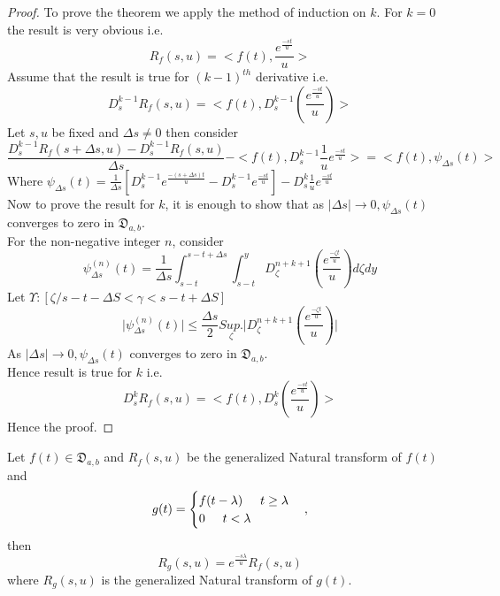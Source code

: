 \begin{proof}
To prove the theorem we apply the method of induction on $k$.
For $k=0$ the result is very obvious i.e.
\begin{equation*}
R_{f}(s,u)=<f(t),\frac{e^{\frac{-st}{u}}}{u}>
\end{equation*}
Assume that the result is true for $(k-1)^{th}$ derivative i.e.
\begin{equation*}
D_{s}^{k-1}R_{f}(s,u)=<f(t),D_{s}^{k-1}(\frac{e^{\frac{-st}{u}}}{u})>
\end{equation*}
Let $s,u$ be fixed and $\Delta{s}\neq 0$ then consider 
\begin{equation}
\frac{ D_{s}^{k-1}R_{f}(s+\Delta{s},u)-D_{s}^{k-1}R_{f}(s,u)}{\Delta{s}}-<f(t),D_{s}^{k-1}\frac{1}{u}e^{\frac{-st}{u}}>=<f(t),\psi_{\Delta{s}}(t)>
\end{equation}
Where $\psi_{\Delta{s}}(t)=\frac{1}{\Delta{s}}[D_{s}^{k-1}e^{\frac{-(s+\Delta{s})t}{u}}-D_{s}^{k-1}e^{\frac{-st}{u}}]-D_{s}^{k}\frac{1}{u}e^{\frac{-st}{u}}$\\
Now to prove the result for $k$, it is enough to show that as $\vert\Delta{s}\vert\rightarrow 0,\psi_{\Delta{s}}(t)$ converges to zero in $\mathfrak{D}_{a,b}$.\\
For the non-negative integer $n$, consider
\begin{equation}
\psi_{\Delta{s}}^{(n)}(t)= \frac{1}{\Delta{s}}\int_{s-t}^{s-t+\Delta{s}}\int_{s-t}^{y}D_{\zeta}^{n+k+1}(\frac{e^{\frac{-\zeta t}{u}}}{u})d\zeta dy
\end{equation}
Let $\Upsilon : [\zeta / s-t-\Delta{S}<\gamma<s-t+\Delta{S}]$
\begin{equation*}
\vert\psi_{\Delta{s}}^{(n)}(t)\vert\leq\frac{\Delta{s}}{2}\underset{\zeta}{Sup.}\vert D_{\zeta}^{n+k+1}(\frac{e^{\frac{-\zeta t}{u}}}{u})\vert
\end{equation*}
 As $\vert\Delta{s}\vert \rightarrow 0 ,\psi_{\Delta{s}}(t)$ converges to zero in $\mathfrak{D}_{a,b}$.\\
Hence result is true for $k$ i.e.
\begin{equation}
D_{s}^{k}R_{f}(s,u)=<f(t),D_{s}^{k}(\frac{e^{\frac{-st}{u}}}{u})>
\end{equation}
Hence the proof.
\end{proof}
\begin{theorem}
Let $f(t)\in \mathfrak{D}_{a,b}$ and $R_{f}(s,u)$ be the generalized Natural transform of $f(t)$ and
\begin{align*}
  g(t) = \begin{cases}
  f(t-\lambda)\hspace{0.5cm}  t\geq\lambda \\
   0           \hspace{0.5cm}  t<\lambda
  \end{cases},
 \end{align*}
 then 
 \begin{equation*}
 R_{g}(s,u)=e^{\frac{-s\lambda}{u}}R_{f}(s,u)
 \end{equation*}
 where $ R_{g}(s,u) $ is the generalized Natural transform of $g(t)$.
\end{theorem}
